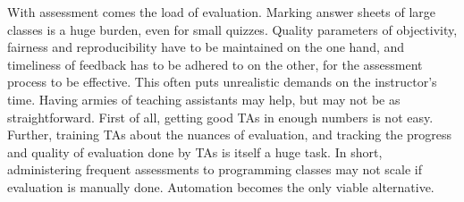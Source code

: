 \documentclass[12pt]{article}
\begin{document}
With assessment comes the load of evaluation. Marking answer sheets of large classes is a huge burden, even for small quizzes. Quality parameters of objectivity, fairness and reproducibility have to be maintained on the one hand, and timeliness of feedback has to be adhered to on the other, for the assessment process to be effective. This often puts unrealistic demands on the instructor's time. Having armies of teaching assistants may help, but may not be as straightforward. First of all, getting good TAs in enough numbers is not easy. Further, training TAs about the nuances of evaluation, and tracking the progress and quality of evaluation done by TAs is itself a huge task. In short, administering frequent assessments to programming classes may not scale if evaluation is manually done. Automation becomes the only viable alternative.
\end{document}
